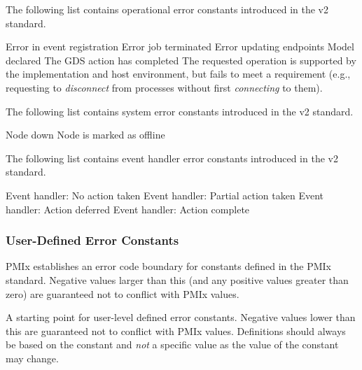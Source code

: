 The following list contains operational error constants introduced in the v2 standard.

\begin{constantdesc}
%
Error in event registration
%
Error job terminated
%
Error updating endpoints
%
Model declared
%
The \ac{GDS} action has completed
%
The requested operation is supported by the implementation and host environment, but fails to meet a requirement (e.g., requesting to \textit{disconnect} from processes without first \textit{connecting} to them).

\end{constantdesc}

The following list contains system error constants introduced in the v2 standard.

\begin{constantdesc}
%
Node down
%
Node is marked as offline
%
\end{constantdesc}

The following list contains event handler error constants introduced in the v2 standard.

\begin{constantdesc}
%
Event handler: No action taken
%
Event handler: Partial action taken
%
Event handler: Action deferred
%
Event handler: Action complete
%
\end{constantdesc}

\subsubsection{User-Defined Error Constants}

PMIx establishes an error code boundary for constants defined in the PMIx standard. Negative values larger than this (and any positive values greater than zero) are guaranteed not to conflict with PMIx values.

\begin{constantdesc}
%
A starting point for user-level defined error constants.
Negative values lower than this are guaranteed not to conflict with PMIx values.
Definitions should always be based on the  constant and \emph{not} a specific value as the value of the constant may change.
%
\end{constantdesc}



